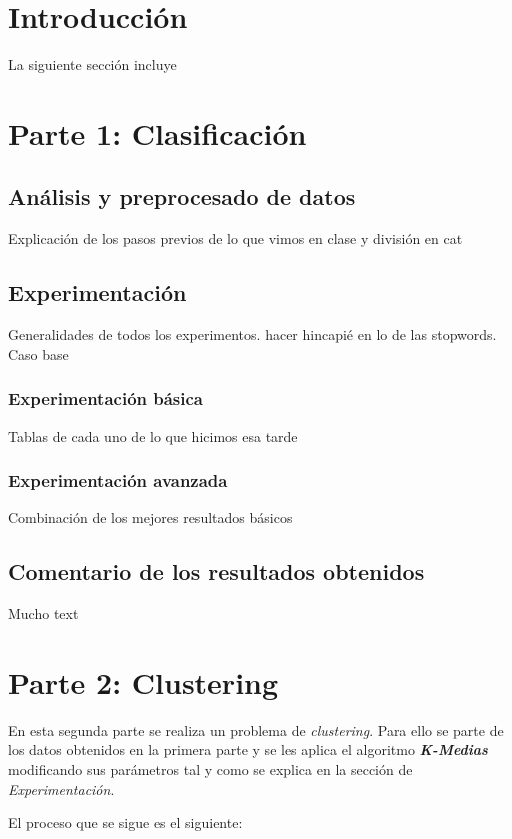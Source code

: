 \documentclass[12pt,a4paper, xcolor=table]{article}
\begin{document}
\section{Introducción}
    La siguiente sección incluye

\section{Parte 1: Clasificación}
    \subsection{Análisis y preprocesado de datos}
        Explicación de los pasos previos de lo que vimos en clase y división en cat
    \subsection{Experimentación}
        Generalidades de todos los experimentos. hacer hincapié en lo de las stopwords. Caso base
        \subsubsection{Experimentación básica}
        Tablas de cada uno de lo que hicimos esa tarde

        \subsubsection{Experimentación avanzada}
        Combinación de los mejores resultados básicos

    \subsection{Comentario de los resultados obtenidos}
    Mucho text

\section{Parte 2: Clustering}

En esta segunda parte se realiza un problema de \textit{clustering}. Para ello se parte de los datos obtenidos en la primera parte y se les aplica el algoritmo \textbf{\textit{K-Medias}} modificando sus parámetros tal y como se explica en la sección de \textit{Experimentación}. 

\vspace{2mm}

El proceso que se sigue es el siguiente:
\end{document}
